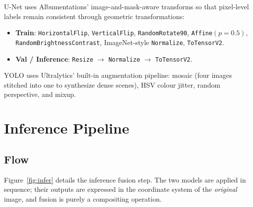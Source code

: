 \documentclass[11pt,a4paper]{article}
\begin{document}
U-Net uses Albumentations' image-and-mask-aware transforms so that pixel-level
labels remain consistent through geometric transformations:

\begin{itemize}[leftmargin=*, itemsep=2pt]
  \item \textbf{Train}: \texttt{HorizontalFlip}, \texttt{VerticalFlip},
    \texttt{RandomRotate90}, \texttt{Affine}$(p=0.5)$, \texttt{RandomBrightnessContrast}, ImageNet-style \texttt{Normalize}, \texttt{ToTensorV2}.
  \item \textbf{Val / Inference}: \texttt{Resize} $\rightarrow$ \texttt{Normalize} $\rightarrow$ \texttt{ToTensorV2}.
\end{itemize}

YOLO uses Ultralytics' built-in augmentation pipeline: mosaic (four images
stitched into one to synthesize dense scenes), HSV colour jitter, random perspective,
and mixup.

\section{Inference Pipeline}

\subsection{Flow}

Figure~\ref{fig:infer} details the inference fusion step. The two models are
applied in sequence; their outputs are expressed in the coordinate system of the
\emph{original} image, and fusion is purely a compositing operation.
\end{document}
